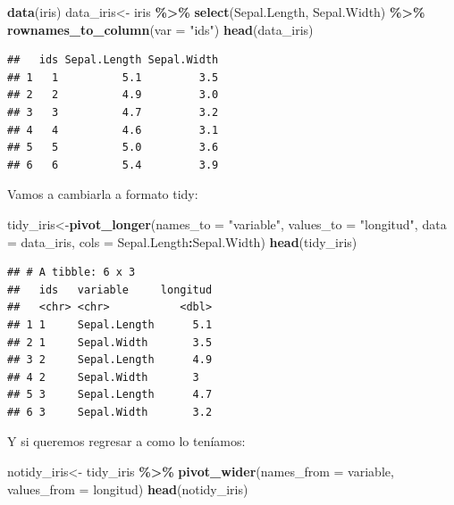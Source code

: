 \documentclass[
]{book}
\newenvironment{Shaded}{\begin{snugshade}}{\end{snugshade}}
\newcommand{\AttributeTok}[1]{\textcolor[rgb]{0.13,0.29,0.53}{#1}}
\newcommand{\FunctionTok}[1]{\textcolor[rgb]{0.13,0.29,0.53}{\textbf{#1}}}
\newcommand{\NormalTok}[1]{#1}
\newcommand{\OtherTok}[1]{\textcolor[rgb]{0.56,0.35,0.01}{#1}}
\newcommand{\SpecialCharTok}[1]{\textcolor[rgb]{0.81,0.36,0.00}{\textbf{#1}}}
\newcommand{\StringTok}[1]{\textcolor[rgb]{0.31,0.60,0.02}{#1}}
\begin{document}
\begin{Shaded}
\begin{Highlighting}[]
\FunctionTok{data}\NormalTok{(iris)}
\NormalTok{data\_iris}\OtherTok{\textless{}{-}}\NormalTok{ iris }\SpecialCharTok{\%\textgreater{}\%} \FunctionTok{select}\NormalTok{(Sepal.Length, Sepal.Width) }\SpecialCharTok{\%\textgreater{}\%} \FunctionTok{rownames\_to\_column}\NormalTok{(}\AttributeTok{var =} \StringTok{"ids"}\NormalTok{)}
\FunctionTok{head}\NormalTok{(data\_iris)}
\end{Highlighting}
\end{Shaded}

\begin{verbatim}
##   ids Sepal.Length Sepal.Width
## 1   1          5.1         3.5
## 2   2          4.9         3.0
## 3   3          4.7         3.2
## 4   4          4.6         3.1
## 5   5          5.0         3.6
## 6   6          5.4         3.9
\end{verbatim}

\hfill\break
Vamos a cambiarla a formato tidy:\\

\begin{Shaded}
\begin{Highlighting}[]
\NormalTok{tidy\_iris}\OtherTok{\textless{}{-}}\FunctionTok{pivot\_longer}\NormalTok{(}\AttributeTok{names\_to =} \StringTok{"variable"}\NormalTok{, }
             \AttributeTok{values\_to =} \StringTok{"longitud"}\NormalTok{, }
             \AttributeTok{data =}\NormalTok{ data\_iris, }
             \AttributeTok{cols =}\NormalTok{ Sepal.Length}\SpecialCharTok{:}\NormalTok{Sepal.Width) }
\FunctionTok{head}\NormalTok{(tidy\_iris)}
\end{Highlighting}
\end{Shaded}

\begin{verbatim}
## # A tibble: 6 x 3
##   ids   variable     longitud
##   <chr> <chr>           <dbl>
## 1 1     Sepal.Length      5.1
## 2 1     Sepal.Width       3.5
## 3 2     Sepal.Length      4.9
## 4 2     Sepal.Width       3  
## 5 3     Sepal.Length      4.7
## 6 3     Sepal.Width       3.2
\end{verbatim}

\hfill\break
Y si queremos regresar a como lo teníamos:\\

\begin{Shaded}
\begin{Highlighting}[]
\NormalTok{notidy\_iris}\OtherTok{\textless{}{-}}\NormalTok{ tidy\_iris  }\SpecialCharTok{\%\textgreater{}\%} \FunctionTok{pivot\_wider}\NormalTok{(}\AttributeTok{names\_from =}\NormalTok{ variable,}
                          \AttributeTok{values\_from =}\NormalTok{ longitud)}
\FunctionTok{head}\NormalTok{(notidy\_iris)}
\end{Highlighting}
\end{Shaded}
\end{document}
